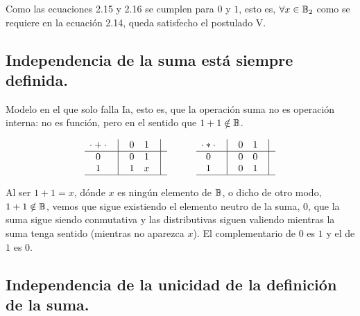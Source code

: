 \documentclass[12pt,a4paper]{article}
\begin{document}
	Como las ecuaciones 2.15 y 2.16 se cumplen para \(0\) y \(1\), esto es,
\(\forall x \in \mathbb{B}_2\) como se requiere en la ecuación 2.14, queda
satisfecho el postulado V.



\subsection{Independencia de la suma está siempre definida.}



Modelo en el que solo falla Ia, esto es, que la operación suma
no es operación interna: no es función, pero en el sentido que \(1 + 1 \notin
\mathbb{B}\).


\[
    \begin{matrix}
        {\cdot + \cdot} & \big{\vert} & {0} & {1} & \big{\vert} \\
        \hline
        {0}             & \big{\vert} & {0} & {1} & \big{\vert} \\
        {1}             & \big{\vert} & {1} & {x} & \big{\vert} \\
        \hline
    \end{matrix}
    \qquad\qquad
    \begin{matrix}
        {\cdot * \cdot} & \big{\vert} & {0} & {1} & \big{\vert} \\
        \hline
        {0}                   & \big{\vert} & {0} & {0} & \big{\vert} \\
        {1}                   & \big{\vert} & {0} & {1} & \big{\vert} \\
        \hline
    \end{matrix}
\]



	Al ser \(1 + 1 = x\), dónde \(x\) es ningún elemento de $\mathbb{B}$, o dicho
de otro modo, \(1 + 1 \notin \mathbb{B}\), vemos que sigue existiendo el elemento
neutro de la suma, \(0\), que la suma sigue siendo conmutativa y las
distributivas siguen valiendo mientras la suma tenga sentido (mientras no
aparezca \(x\)). El complementario de \(0\) es \(1\) y el de \(1\) es \(0\).



\subsection{Independencia de la unicidad de la definición de la suma.}
\end{document}
